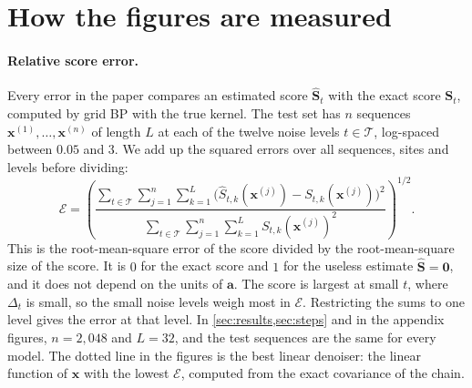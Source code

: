 \section{How the figures are measured}
\label{app:measures}

\paragraph{Relative score error.} Every error in the paper compares an estimated score $\widehat{\mathbf S}_t$ with
the exact score $\mathbf S_t$, computed by grid BP with the true kernel. The test set has $n$ sequences
$\mathbf x^{(1)},\ldots,\mathbf x^{(n)}$ of length $L$ at each of the twelve noise levels $t\in\mathcal T$, log-spaced
between $0.05$ and $3$. We add up the squared errors over all sequences, sites and levels before dividing:
\begin{equation}
  \mathcal E
  =\left(
  \frac{\sum_{t\in\mathcal T}\sum_{j=1}^{n}\sum_{k=1}^{L}
        \big(\widehat S_{t,k}(\mathbf x^{(j)})-S_{t,k}(\mathbf x^{(j)})\big)^2}
       {\sum_{t\in\mathcal T}\sum_{j=1}^{n}\sum_{k=1}^{L}
        S_{t,k}(\mathbf x^{(j)})^2}
  \right)^{1/2}.
  \label{eq:rel-error}
\end{equation}
This is the root-mean-square error of the score divided by the root-mean-square size of the score. It is $0$ for the
exact score and $1$ for the useless estimate $\widehat{\mathbf S}=\mathbf 0$, and it does not depend on the units of
$\mathbf a$. The score is largest at small $t$, where $\Delta_t$ is small, so the small noise levels weigh most in
$\mathcal E$. Restricting the sums to one level gives the error at that level. In \cref{sec:results,sec:steps} and in
the appendix figures, $n=2{,}048$ and $L=32$, and the test sequences are the same for every model. The dotted line in
the figures is the best linear denoiser: the linear function of $\mathbf x$ with the lowest $\mathcal E$, computed from
the exact covariance of the chain.

